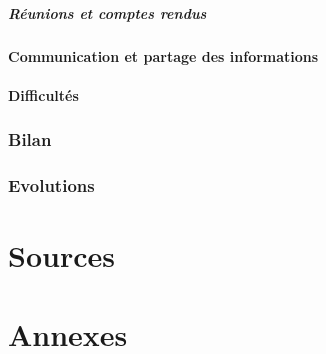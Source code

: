 \documentclass{article}
\begin{document}
\subsubsection{Réunions et comptes rendus}

\subsection{Communication et partage des informations}

\subsection{Difficultés}

\newpage


\section{Bilan}

\newpage


\section{Evolutions}

\newpage


\part*{Sources}

\newpage


\part*{Annexes}

\newpage
\end{document}

